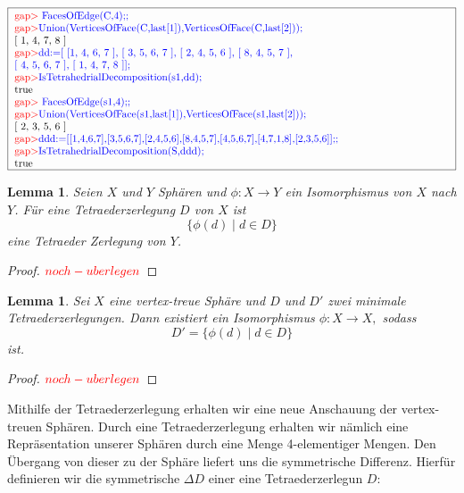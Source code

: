 \documentclass[12pt,titlepage,twoside,cleardoublepage]{article}
\theoremstyle{nummermitklammern}
\newtheorem{lemma}[temp]{Lemma}
\newtheorem{lemma}[zahl]{Lemma}
\numberwithin{equation}{section}
\begin{document}
 \begin{center}
 $\fbox{
\parbox{15cm}{
\textcolor{red}{gap$>$} \textcolor{blue}{FacesOfEdge(C,4);;}\newline 
\textcolor{red}{gap$>$}\textcolor{blue}{Union(VerticesOfFace(C,last[1]),VerticesOfFace(C,last[2]));}
\newline
 [ 1, 4, 7, 8 ]\newline 
\textcolor{red}{gap$>$}\textcolor{blue}{dd:=[ [1, 4, 6, 7 ], [ 3, 5, 6, 7 ], [ 2, 4, 5, 6 ], [ 8, 4, 5, 7 ],$ \newline $ [ 4, 5, 6, 7 ], [ 1,
4, 7, 8 ]];}\newline 
\textcolor{red}{gap$>$}\textcolor{blue}{ IsTetrahedrialDecomposition(s1,dd);}\newline 
true\newline 
\textcolor{red}{gap$>$} \textcolor{blue}{FacesOfEdge(s1,4);;}\newline 
\textcolor{red}{gap$>$}\textcolor{blue}{Union(VerticesOfFace(s1,last[1]),VerticesOfFace(s1,last[2]));}
\newline [ 2, 3, 5, 6 ]\newline 
\textcolor{red}{gap$>$}\textcolor{blue}{ddd:=[[1,4,6,7],[3,5,6,7],[2,4,5,6],[8,4,5,7],[4,5,6,7],[4,7,1,8],[2,3,5,6]];;}\newline 
\textcolor{red}{gap$>$}\textcolor{blue}{IsTetrahedrialDecomposition(S,ddd);}\newline 
true
 }}$
 \end{center}
\begin{lemma}
Seien $X$ und $Y$ Sphären und $\phi:X\to Y$ ein Isomorphismus von $X$ nach $Y$. Für eine Tetraederzerlegung $D$ von $X$ ist \[
\{\phi(d)\mid d\in D\}
\] eine Tetraeder Zerlegung von $Y$.
\end{lemma}
\begin{proof}
$\textcolor{red}{noch-uberlegen}$
\end{proof}
\begin{lemma}
Sei $X$ eine vertex-treue Sphäre und $D$ und $D'$ zwei minimale Tetraederzerlegungen. Dann existiert ein Isomorphismus $\phi:X\to X,$ sodass
\[
D'=\{\phi(d)\mid d\in D\}
\]
ist.
\end{lemma}
\begin{proof}
$\textcolor{red}{noch-uberlegen}$
\end{proof}
Mithilfe der Tetraederzerlegung erhalten wir eine neue Anschauung der vertex-treuen Sphären. Durch eine Tetraederzerlegung erhalten wir nämlich eine Repräsentation unserer Sphären durch eine Menge 4-elementiger Mengen. Den Übergang von dieser zu der Sphäre liefert uns die symmetrische Differenz. Hierfür definieren wir die symmetrische $\Delta D$ einer eine Tetraederzerlegun $D:$
\end{document}
